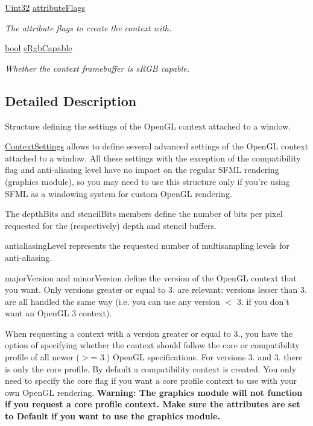\begin{DoxyCompactItemize}
\hyperlink{namespacesf_aa746fb1ddef4410bddf198ebb27e727c}{Uint32} \hyperlink{structsf_1_1_context_settings_a0ef3fc53802bc0197d2739466915ada5}{attribute\-Flags}
\begin{DoxyCompactList}\small\item\em The attribute flags to create the context with. \end{DoxyCompactList}\item 
\hyperlink{term__entry_8h_a002004ba5d663f149f6c38064926abac}{bool} \hyperlink{structsf_1_1_context_settings_ac93b041bfb6cbd36034997797708a0a3}{s\-Rgb\-Capable}
\begin{DoxyCompactList}\small\item\em Whether the context framebuffer is s\-R\-G\-B capable. \end{DoxyCompactList}\end{DoxyCompactItemize}


\subsection{Detailed Description}
Structure defining the settings of the Open\-G\-L context attached to a window. 

\hyperlink{structsf_1_1_context_settings}{Context\-Settings} allows to define several advanced settings of the Open\-G\-L context attached to a window. All these settings with the exception of the compatibility flag and anti-\/aliasing level have no impact on the regular S\-F\-M\-L rendering (graphics module), so you may need to use this structure only if you're using S\-F\-M\-L as a windowing system for custom Open\-G\-L rendering.

The depth\-Bits and stencil\-Bits members define the number of bits per pixel requested for the (respectively) depth and stencil buffers.

antialiasing\-Level represents the requested number of multisampling levels for anti-\/aliasing.

major\-Version and minor\-Version define the version of the Open\-G\-L context that you want. Only versions greater or equal to 3. are relevant; versions lesser than 3. are all handled the same way (i.\-e. you can use any version $<$ 3. if you don't want an Open\-G\-L 3 context).

When requesting a context with a version greater or equal to 3., you have the option of specifying whether the context should follow the core or compatibility profile of all newer ($>$= 3.) Open\-G\-L specifications. For versions 3. and 3. there is only the core profile. By default a compatibility context is created. You only need to specify the core flag if you want a core profile context to use with your own Open\-G\-L rendering. {\bfseries Warning\-: The graphics module will not function if you request a core profile context. Make sure the attributes are set to Default if you want to use the graphics module.}

